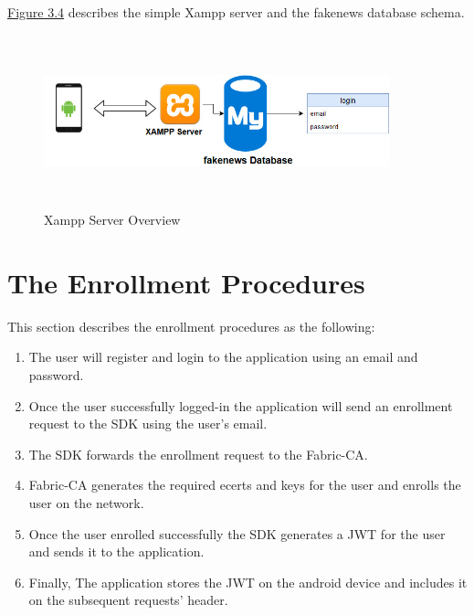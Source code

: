 \hyperref[fig:xampp]{Figure 3.4} describes the simple Xampp server and the fakenews database schema.     
 \begin{figure}[H]
\centering
\includegraphics[width=10cm,height=5cm]{images/xampp.jpg}
\caption{Xampp Server Overview}
\label{fig:xampp}
\end{figure}

\cleardoublepage

\section{The Enrollment Procedures} 
This section describes the enrollment procedures as the following: 


\begin{enumerate}
  \item The user will register and login to the application using an email and password.
  \item Once the user successfully logged-in the application will send an enrollment request to the SDK using the user's email.
  \item The SDK forwards the enrollment request to the Fabric-CA.
  \item Fabric-CA generates the required ecerts and keys for the user and enrolls the user on the network.
   \item Once the user enrolled successfully the SDK generates a JWT for the user and sends it to the application. 
    \item Finally, The application stores the JWT on the android device and includes it on the subsequent requests' header.
 
\end{enumerate}

